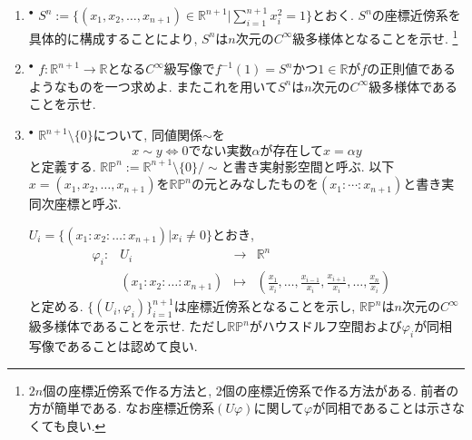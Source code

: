 \documentclass[dvipdfmx,a4paper,11pt]{article}
\newcommand{\R}{\mathbb{R}}
\theoremstyle{definition}
\begin{document}
\begin{enumerate}[label=\textbf{問}\ref*{sec-manifold}.\arabic*]

\item $^\bullet$ \label{sphere} $S^{n} := \{ (x_1, x_2, \ldots, x_{n+1}) \in \R^{n+1}| \sum_{i=1}^{n+1} x_{i}^{2} = 1 \}$とおく. 
$S^n$の座標近傍系を具体的に構成することにより, $S^{n}$は$n$次元の$C^{\infty}$級多様体となることを示せ. \footnote{$2n$個の座標近傍系で作る方法と, $2$個の座標近傍系で作る方法がある. 前者の方が簡単である. なお座標近傍系$(U \varphi)$に関して$\varphi$が同相であることは示さなくても良い.}
	
\item $^\bullet$ $f : \R^{n+1} \rightarrow \R$となる$C^{\infty}$級写像で$f^{-1}(1) = S^{n}$かつ$1 \in \R$が$f$の正則値であるようなものを一つ求めよ. またこれを用いて$S^{n}$は$n$次元の$C^{\infty}$級多様体であることを示せ. 

\item  \label{real_plane} $^\bullet$ $\R^{n+1} \setminus \{ 0\}$について, 同値関係$\sim$を
	$$
	x \sim y \Leftrightarrow \text{0でない実数$\alpha$が存在して$x = \alpha y$}
	$$
	と定義する.
	$ \R\mathbb{P}^{n}:= \R^{n+1} \setminus \{ 0\}/\sim$と書き実射影空間と呼ぶ. %
	以下$x= (x_{1}, x_{2}, \ldots, x_{n+1})$を$\R\mathbb{P}^{n}$の元とみなしたものを$(x_{1}: \cdots : x_{n+1})$と書き実同次座標と呼ぶ. 

 $U_{i} = \{ (x_{1}:x_{2}: \ldots : x_{n+1}) | x_{i}\neq 0\}$とおき, 
$$
\begin{array}{ccccc}
\varphi_{i}: &U_{i}& \rightarrow & \R^{n} & \\
&(x_{1}:x_{2}: \ldots : x_{n+1})& \longmapsto &(\frac{x_1}{x_i}, \ldots, \frac{x_{i-1}}{x_i}, \frac{x_{i+1}}{x_i}, \ldots, \frac{x_n}{x_i})&
\end{array}
$$	
と定める. $\{ (U_i , \varphi_{i})\}_{i=1}^{n+1}$は座標近傍系となることを示し, $\R \mathbb{P}^{n}$は$n$次元の$C^{\infty}$級多様体であることを示せ. ただし$\R \mathbb{P}^{n}$がハウスドルフ空間および$\varphi_i$が同相写像であることは認めて良い. 



\end{enumerate}
\end{document}
